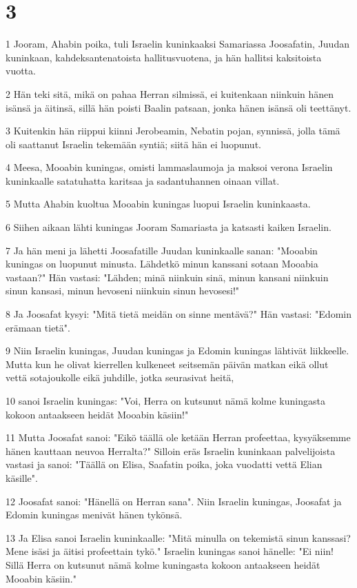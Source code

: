 \chapter{3}

\par 1 Jooram, Ahabin poika, tuli Israelin kuninkaaksi Samariassa Joosafatin, Juudan kuninkaan, kahdeksantenatoista hallitusvuotena, ja hän hallitsi kaksitoista vuotta.
\par 2 Hän teki sitä, mikä on pahaa Herran silmissä, ei kuitenkaan niinkuin hänen isänsä ja äitinsä, sillä hän poisti Baalin patsaan, jonka hänen isänsä oli teettänyt.
\par 3 Kuitenkin hän riippui kiinni Jerobeamin, Nebatin pojan, synnissä, jolla tämä oli saattanut Israelin tekemään syntiä; siitä hän ei luopunut.
\par 4 Meesa, Mooabin kuningas, omisti lammaslaumoja ja maksoi verona Israelin kuninkaalle satatuhatta karitsaa ja sadantuhannen oinaan villat.
\par 5 Mutta Ahabin kuoltua Mooabin kuningas luopui Israelin kuninkaasta.
\par 6 Siihen aikaan lähti kuningas Jooram Samariasta ja katsasti kaiken Israelin.
\par 7 Ja hän meni ja lähetti Joosafatille Juudan kuninkaalle sanan: "Mooabin kuningas on luopunut minusta. Lähdetkö minun kanssani sotaan Mooabia vastaan?" Hän vastasi: "Lähden; minä niinkuin sinä, minun kansani niinkuin sinun kansasi, minun hevoseni niinkuin sinun hevosesi!"
\par 8 Ja Joosafat kysyi: "Mitä tietä meidän on sinne mentävä?" Hän vastasi: "Edomin erämaan tietä".
\par 9 Niin Israelin kuningas, Juudan kuningas ja Edomin kuningas lähtivät liikkeelle. Mutta kun he olivat kierrellen kulkeneet seitsemän päivän matkan eikä ollut vettä sotajoukolle eikä juhdille, jotka seurasivat heitä,
\par 10 sanoi Israelin kuningas: "Voi, Herra on kutsunut nämä kolme kuningasta kokoon antaakseen heidät Mooabin käsiin!"
\par 11 Mutta Joosafat sanoi: "Eikö täällä ole ketään Herran profeettaa, kysyäksemme hänen kauttaan neuvoa Herralta?" Silloin eräs Israelin kuninkaan palvelijoista vastasi ja sanoi: "Täällä on Elisa, Saafatin poika, joka vuodatti vettä Elian käsille".
\par 12 Joosafat sanoi: "Hänellä on Herran sana". Niin Israelin kuningas, Joosafat ja Edomin kuningas menivät hänen tykönsä.
\par 13 Ja Elisa sanoi Israelin kuninkaalle: "Mitä minulla on tekemistä sinun kanssasi? Mene isäsi ja äitisi profeettain tykö." Israelin kuningas sanoi hänelle: "Ei niin! Sillä Herra on kutsunut nämä kolme kuningasta kokoon antaakseen heidät Mooabin käsiin."

